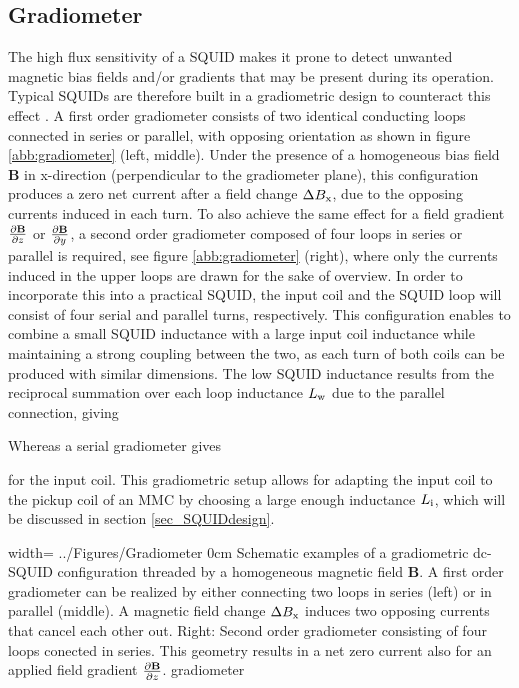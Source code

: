 \subsection{Gradiometer}

The high flux sensitivity of a SQUID makes it prone to detect unwanted magnetic bias fields and/or gradients that may be present during its operation. Typical SQUIDs are therefore built in a gradiometric design to counteract this effect \cite{Ketchen1978}. A first order gradiometer consists of two identical conducting loops connected in series or parallel, with opposing orientation as shown in figure \ref{abb:gradiometer} (left, middle). Under the presence of a homogeneous bias field $\textbf{B}$ in x-direction (perpendicular to the gradiometer plane), this configuration produces a zero net current after a field change $\Delta B_{\rm x}$, due to the opposing currents induced in each turn. To also achieve the same effect for a field gradient $\frac{\partial \textbf{B}}{\partial z}$ or $\frac{\partial \textbf{B}}{\partial y}$, a second order gradiometer composed of four loops in series or parallel is required, see figure \ref{abb:gradiometer} (right), where only the currents induced in the upper loops are drawn for the sake of overview. In order to incorporate this into a practical SQUID, the input coil and the SQUID loop will consist of four serial and parallel turns, respectively. This configuration enables to combine a small SQUID inductance with a large input coil inductance while maintaining a strong coupling between the two, as each turn of both coils can be produced with similar dimensions. The low SQUID inductance results from the reciprocal summation over each loop inductance $L_{\rm w}$ due to the parallel connection, giving


Whereas a serial gradiometer gives 


for the input coil. This gradiometric setup allows for adapting the input coil to the pickup coil of an MMC by choosing a large enough inductance $L_{\rm i}$, which will be discussed in section \ref{sec_SQUIDdesign}. 

{width=\textwidth}
{../Figures/Gradiometer}
{0cm}   %
{Schematic examples of a gradiometric dc-SQUID configuration threaded by a homogeneous magnetic field $\textbf{B}$. A first order gradiometer can be realized by either connecting two loops in series (left) or in parallel (middle). A magnetic field change $\Delta B_{\rm x}$ induces two opposing currents that cancel each other out. Right: Second order gradiometer consisting of four loops conected in series. This geometry results in a net zero current also for an applied field gradient $\frac{\partial \textbf{B}}{\partial z}$.}
{gradiometer}
   
